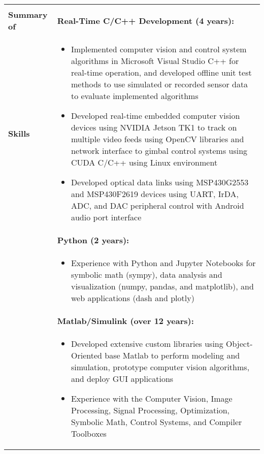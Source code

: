 \begin{tabular}{L{\hlcolw}  L{\rcolw}}
	\hline \hline \\
	\textbf{\Large Summary of } & 
	\textbf{Real-Time C/C++ Development (4 years):}
	\\
	
	\textbf{\Large Skills} & 
	\vspace{-0.25in}
	\begin{itemize}[leftmargin = \itemmargin]
		\item Implemented computer vision and control system algorithms in Microsoft Visual Studio C++ for real-time operation, and developed offline unit test methods to use simulated or recorded sensor data to evaluate implemented algorithms
	
		\item Developed real-time embedded computer vision devices using NVIDIA Jetson TK1 to track on multiple video feeds using OpenCV libraries and network interface to gimbal control systems using CUDA C/C++ using Linux environment
	
		\item Developed optical data links using MSP430G2553 and MSP430F2619 devices using UART, IrDA, ADC, and DAC peripheral control with Android audio port interface
	\end{itemize} \\
	
	& \textbf{Python (2 years):} \\
	&
	\vspace{-0.25in}
	\begin{itemize}[leftmargin = \itemmargin]
		\item Experience with Python and Jupyter Notebooks for symbolic math (sympy), 
		data analysis and visualization (numpy, pandas, and matplotlib), and web applications (dash and plotly)
	\end{itemize}
	\\
	
	& \textbf{Matlab/Simulink (over 12 years):} \\
	& 	
	\vspace{-0.25in}
	\begin{itemize}[leftmargin = \itemmargin]
		
		\item Developed extensive custom libraries using Object-Oriented base Matlab to perform modeling and simulation, 
		prototype computer vision algorithms, and deploy GUI applications
		
		\item Experience with the Computer Vision, Image Processing, Signal Processing, Optimization, Symbolic Math, Control Systems, and Compiler Toolboxes
		

\end{itemize}
\end{tabular}
